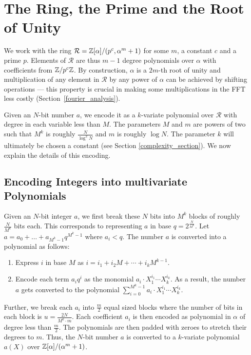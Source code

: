 \documentclass[11pt]{article}
\renewcommand{\R}{\mathcal{R}} %
\begin{document}
\section{The Ring, the Prime and the Root of Unity}\label{ring_section}

We work with the ring $\R = \Z[\alpha]/(p^c, \alpha^m + 1)$ for some
$m$, a constant $c$ and a prime $p$. Elements of $\R$ are thus $m-1$
degree polynomials over $\alpha$ with coefficients {}from $\mathbb{Z}/p^c\mathbb{Z}$. By
construction, $\alpha$ is a $2m$-th root of unity and multiplication
of any element in $\R$ by any power of $\alpha$ can be achieved by
shifting operations --- this property is crucial in making some
multiplications in the FFT less costly
(Section~\ref{fourier_analysis}).

Given an $N$-bit number $a$, we encode it as a $k$-variate polynomial
over $\R$ with degree in each variable less than $M$. The parameters
$M$ and $m$ are powers of two such that $M^k$ is roughly
$\frac{N}{\log^2N}$ and $m$ is roughly $\log{N}$. The parameter $k$
will ultimately be chosen a constant (see Section
\ref{complexity_section}). We now explain the details of this
encoding.

\subsection{Encoding Integers into multivariate
  Polynomials}\label{encoding_section}

Given an $N$-bit integer $a$, we first break these $N$ bits into $M^k$
blocks of roughly $\frac{N}{M^k}$ bits each. This corresponds to
representing $a$ in base $q = 2^{\frac{N}{M^k}}$.  Let $a = a_0 +
\ldots + a_{M^k-1}q^{M^k - 1}$ where $a_i < q$. The number $a$ is
converted into a polynomial as follows:
\begin{enumerate}
\item Express $i$ in base $M$ as $i = i_1 + i_2M + \cdots +
  i_kM^{k-1}$. \label{base_M_item}
\item Encode each term $a_iq^i$ as the monomial $a_i\cdot
  X_1^{i_1}\cdots X_k^{i_k}$. As a result, the number $a$
  gets converted to the polynomial $\sum_{i=0}^{M^k - 1}
  a_i\cdot X_1^{i_1}\cdots X_k^{i_k}$.
\end{enumerate}

Further, we break each $a_i$ into $\frac{m}{2}$ equal sized blocks
where the number of bits in each block is $u = \frac{2N}{M^k\cdot m}$.
Each coefficient $a_i$ is then encoded as polynomial in $\alpha$ of
degree less than $\frac{m}{2}$. The polynomials are then padded with
zeroes to stretch their degrees to $m$. Thus, the $N$-bit number $a$
is converted to a $k$-variate polynomial $a(X)$ over
$\mathbb{Z}[\alpha]/(\alpha^m + 1)$.\\
\end{document}
